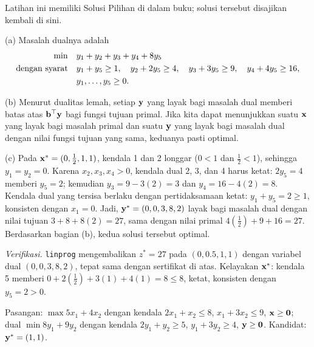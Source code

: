 
Latihan ini memiliki Solusi Pilihan di dalam buku; solusi tersebut disajikan kembali di sini.

(a) Masalah dualnya adalah
\[
\begin{aligned}
\min \quad & y_1 + y_2 + y_3 + y_4 + 8y_5 \\
\mbox{dengan syarat}\quad & y_1 + y_5 \geq 1, \quad y_2 + 2y_5 \geq 4, \quad y_3 + 3y_5 \geq 9, \quad y_4 + 4y_5 \geq 16, \\
& y_1, \dots, y_5 \geq 0.
\end{aligned}
\]

(b) Menurut dualitas lemah, setiap $\mathbf{y}$ yang layak bagi masalah dual memberi batas atas $\mathbf{b}^\top \mathbf{y}$ bagi fungsi tujuan primal. Jika kita dapat menunjukkan suatu $\mathbf{x}$ yang layak bagi masalah primal dan suatu $\mathbf{y}$ yang layak bagi masalah dual dengan nilai fungsi tujuan yang sama, keduanya pasti optimal.

(c) Pada $\mathbf{x}^* = (0, \tfrac{1}{2}, 1, 1)$, kendala 1 dan 2 longgar ($0 < 1$ dan $\tfrac12 < 1$), sehingga $y_1 = y_2 = 0$. Karena $x_2, x_3, x_4 > 0$, kendala dual 2, 3, dan 4 harus ketat: $2y_5 = 4$ memberi $y_5 = 2$; kemudian $y_3 = 9 - 3(2) = 3$ dan $y_4 = 16 - 4(2) = 8$. Kendala dual yang tersisa berlaku dengan pertidaksamaan ketat: $y_1 + y_5 = 2 \geq 1$, konsisten dengan $x_1 = 0$. Jadi, $\mathbf{y}^* = (0, 0, 3, 8, 2)$ layak bagi masalah dual dengan nilai tujuan $3 + 8 + 8(2) = 27$, sama dengan nilai primal $4(\tfrac12) + 9 + 16 = 27$. Berdasarkan bagian (b), kedua solusi tersebut optimal.

\emph{Verifikasi.} \texttt{linprog} mengembalikan $z^* = 27$ pada $(0, 0.5, 1, 1)$ dengan variabel dual $(0, 0, 3, 8, 2)$, tepat sama dengan sertifikat di atas. Kelayakan $\mathbf{x}^*$: kendala 5 memberi $0 + 2(\tfrac12) + 3(1) + 4(1) = 8 \le 8$, ketat, konsisten dengan $y_5 = 2 > 0$.


Pasangan: $\max 5x_1 + 4x_2$ dengan kendala $2x_1 + x_2 \le 8$, $x_1 + 3x_2 \le 9$, $\mathbf{x} \ge \mathbf{0}$; dual $\min 8y_1 + 9y_2$ dengan kendala $2y_1 + y_2 \ge 5$, $y_1 + 3y_2 \ge 4$, $\mathbf{y} \ge \mathbf{0}$. Kandidat: $\mathbf{y}^* = (1, 1)$.

